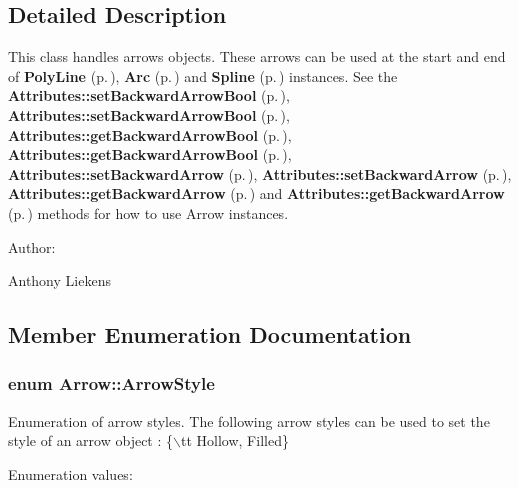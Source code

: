 \subsection{Detailed Description}
This class handles arrows objects. These arrows can be used at the start and end of {\bf Poly\-Line} {\rm (p.\,\pageref{classPolyLine})}, {\bf Arc} {\rm (p.\,\pageref{classArc})} and {\bf Spline} {\rm (p.\,\pageref{classSpline})} instances. See the {\bf Attributes::set\-Backward\-Arrow\-Bool} {\rm (p.\,\pageref{classAttributes_a14})}, {\bf Attributes::set\-Backward\-Arrow\-Bool} {\rm (p.\,\pageref{classAttributes_a14})}, {\bf Attributes::get\-Backward\-Arrow\-Bool} {\rm (p.\,\pageref{classAttributes_a36})}, {\bf Attributes::get\-Backward\-Arrow\-Bool} {\rm (p.\,\pageref{classAttributes_a36})}, {\bf Attributes::set\-Backward\-Arrow} {\rm (p.\,\pageref{classAttributes_a16})}, {\bf Attributes::set\-Backward\-Arrow} {\rm (p.\,\pageref{classAttributes_a16})}, {\bf Attributes::get\-Backward\-Arrow} {\rm (p.\,\pageref{classAttributes_a38})} and {\bf Attributes::get\-Backward\-Arrow} {\rm (p.\,\pageref{classAttributes_a38})} methods for how to use Arrow instances. \begin{Desc}
\item[Author: ]\par
Anthony Liekens \end{Desc}




\subsection{Member Enumeration Documentation}
\subsubsection{\setlength{\rightskip}{0pt plus 5cm}enum Arrow::Arrow\-Style}\label{classArrow_s7}


Enumeration of arrow styles. The following arrow styles can be used to set the style of an arrow object : \{$\backslash$tt Hollow, Filled\} \begin{Desc}
\item[Enumeration values: ]\par
\begin{description}
\item[{\em 
{\em Hollow}\label{classArrow_s7s4}
}]\item[{\em 
{\em Filled}\label{classArrow_s7s5}
}]\end{description}
\end{Desc}

